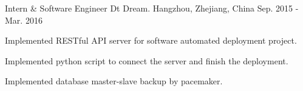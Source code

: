 

\begin{cventries}

  \cventry
    {Intern \& Software Engineer} %
    {Dt Dream.} %
    {Hangzhou, Zhejiang, China} %
    {Sep. 2015 - Mar. 2016} %
    {
      \begin{cvitems} %
        \item {Implemented RESTful API server for software automated deployment project.}
        \item {Implemented python script to connect the server and finish the deployment.}
        \item {Implemented database master-slave backup by pacemaker.}
      \end{cvitems}
    }

\end{cventries}
